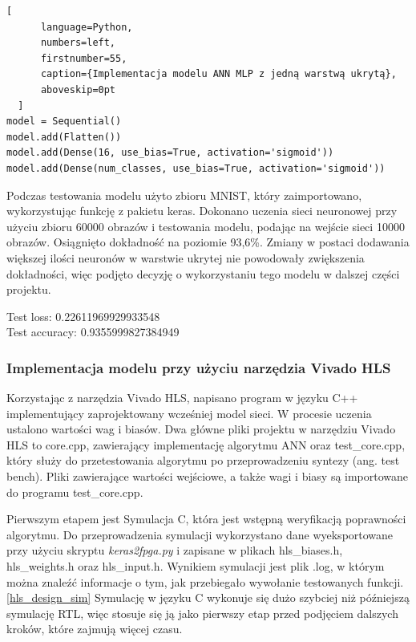 \begin{addmargin}[10mm]{0mm}
  \begin{lstlisting}[
      language=Python,
      numbers=left,
      firstnumber=55,
      caption={Implementacja modelu ANN MLP z jedną warstwą ukrytą},
      aboveskip=0pt
  ]
model = Sequential()
model.add(Flatten())
model.add(Dense(16, use_bias=True, activation='sigmoid'))
model.add(Dense(num_classes, use_bias=True, activation='sigmoid'))

  \end{lstlisting}
  \end{addmargin}

Podczas testowania modelu użyto zbioru MNIST, który zaimportowano, wykorzystując
funkcję z pakietu keras. Dokonano uczenia sieci neuronowej przy użyciu zbioru 60000 
obrazów i testowania modelu, podając na wejście sieci 10000 obrazów. Osiągnięto 
dokładność na poziomie 93,6\%. 
Zmiany w postaci dodawania większej ilości neuronów w warstwie ukrytej nie powodowały 
zwiększenia dokładności, więc podjęto decyzję o wykorzystaniu tego modelu w dalszej 
części projektu.

Test loss: 0.22611969929933548\\
Test accuracy: 0.9355999827384949


\subsubsection{Implementacja modelu przy użyciu narzędzia Vivado HLS}

Korzystając z narzędzia Vivado HLS, napisano program w języku C++ implementujący 
zaprojektowany wcześniej model sieci. W procesie uczenia ustalono wartości wag i 
biasów. Dwa główne pliki projektu w narzędziu Vivado HLS to core.cpp, zawierający 
implementację algorytmu ANN oraz test\_core.cpp, który służy do przetestowania
algorytmu po przeprowadzeniu syntezy (ang. test bench).   
Pliki zawierające wartości wejściowe, a także wagi i biasy są importowane 
do programu test\_core.cpp. 

Pierwszym etapem jest Symulacja C, która jest wstępną weryfikacją poprawności
algorytmu. Do przeprowadzenia symulacji wykorzystano dane wyeksportowane przy użyciu 
skryptu \emph{keras2fpga.py} i zapisane w plikach hls\_biases.h, hls\_weights.h oraz 
hls\_input.h. Wynikiem symulacji jest plik .log, w którym można znaleźć informacje o
tym, jak przebiegało wywołanie testowanych funkcji.\ref{hls_design_sim}
Symulację w języku C wykonuje się dużo szybciej niż późniejszą symulację RTL, więc
stosuje się ją jako pierwszy etap przed podjęciem dalszych kroków, które zajmują 
więcej czasu.

